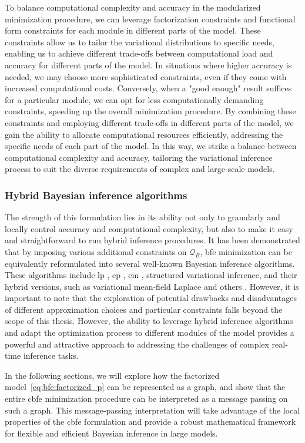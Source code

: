 To balance computational complexity and accuracy in the modularized minimization procedure, we
can leverage factorization constraints and functional form constraints for each module in
different parts of the model.
These constraints allow us to tailor the variational distributions to specific needs, enabling
us to achieve different trade-offs between computational load and accuracy for different
parts of the model.
In situations where higher accuracy is needed, we may choose more sophisticated constraints,
even if they come with increased computational costs.
Conversely, when a "good enough" result suffices for a particular module, we can opt for less
computationally demanding constraints, speeding up the overall minimization procedure.
By combining these constraints and employing different trade-offs in different parts of the
model, we gain the ability to allocate computational resources efficiently, addressing the
specific needs of each part of the model.
In this way, we strike a balance between computational complexity and accuracy, tailoring the
variational inference process to suit the diverse requirements of complex and large-scale
models.

\subsubsection{Hybrid Bayesian inference algorithms}

The strength of this formulation lies in its ability not only to granularly and locally
control accuracy and computational complexity, but also to make it easy and straightforward to
run hybrid inference procedures.
It has been demonstrated that by imposing various additional constraints on $\mathcal{Q}_B$,
\ac{bfe} minimization can be equivalently reformulated into several well-known Bayesian inference algorithms.
These algorithms include \ac{lp} \citep{smola_laplace_2004}, \ac{ep} \citep{raymond_expectation_2014}, \ac{em} \citep{moon_em_1996}, structured variational inference, and their hybrid versions, such as variational mean-field Laplace and others \citep{senoz_variational_2021}.
However, it is important to note that the exploration of potential drawbacks and disadvantages
of different approximation choices and particular constraints falls beyond the scope of this
thesis.
However, the ability to leverage hybrid inference algorithms and adapt the optimization
process to different modules of the model provides a powerful and attractive approach to
addressing the challenges of complex real-time inference tasks.

In the following sections, we will explore how the factorized model~\eqref{eq:bfe:factorized_p} can be
represented as a graph, and show that the entire \ac{cbfe} minimization procedure can be
interpreted as a message passing on such a graph.
This message-passing interpretation will take advantage of the local properties of the \ac{cbfe} formulation
and provide a robust mathematical framework for flexible and efficient Bayesian inference in
large models.

